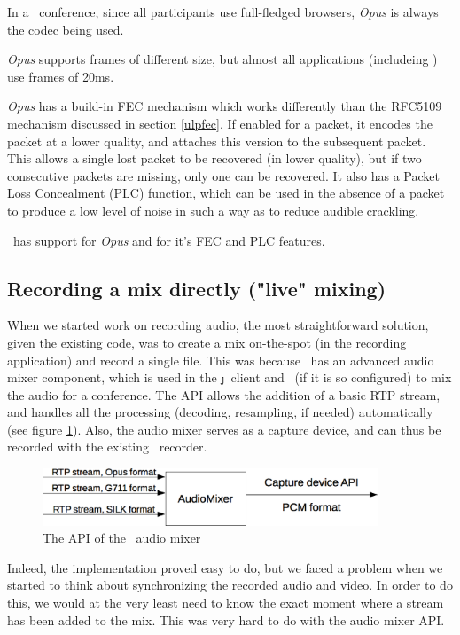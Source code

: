 \documentclass[twoside,openright,a4paper,12pt,english]{article}
\begin{document}
In a \jm\ conference, since all participants use full-fledged
browsers, \emph{Opus} is always the codec being used.

\emph{Opus} supports frames of different size, but almost all applications (includeing \wrtc) use frames of 20ms. 

\emph{Opus} has a build-in FEC mechanism which works differently than the
RFC5109 mechanism discussed in section \ref{ulpfec}. If enabled for a packet,
it encodes the packet at a lower quality, and attaches this
version to the subsequent packet. This allows a single lost packet to be
recovered (in lower quality), but if two consecutive packets are missing, only
one can be recovered. It also has a Packet Loss Concealment (PLC) function, which
can be used in the absence of a packet to produce a low level of noise in such
a way as to reduce audible crackling.

\lj\ has support for \emph{Opus} and for it's FEC and PLC features.


\subsection{Recording a mix directly ("live" mixing)}
When we started work on recording audio, the most straightforward solution,
given the existing code, was to create a mix on-the-spot (in the recording
application) and record a single file. This was because \lj\ has an advanced
audio mixer component, which is used in the \j\ client and \jvb\  (if it is so
configured) to mix the audio for a conference. The API allows the addition of a
basic RTP stream, and handles all the processing (decoding, resampling, if
needed) automatically (see figure \ref{audio-mixer}). Also, the audio mixer
serves as a capture device, and
can thus be recorded with the existing \lj\ recorder.

\begin{figure}[h]
    \includegraphics[width=10cm]{./pics/audio-mixer.eps}
    \caption{The API of the \lj\ audio mixer}
    \label{audio-mixer}
\end{figure}

Indeed, the implementation proved easy to do, but we faced a problem when we
started to think about synchronizing the recorded audio and video. In order to
do this, we would at the very least need to know the exact moment where a
stream has been added to the mix. This was very hard to do with the audio mixer
API.
\end{document}
